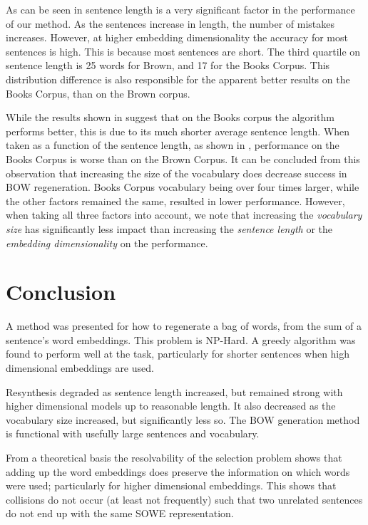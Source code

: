 \documentclass{book}
\begin{document}
As can be seen in  sentence length is a very significant factor in the performance of our method. As the sentences increase in length, the number of mistakes increases. However, at higher embedding dimensionality the accuracy for most sentences is high. This is because most sentences are short. The third quartile on sentence length is 25 words for Brown, and 17 for the Books Corpus. This distribution difference is also responsible for the apparent better results on the Books Corpus, than on the Brown corpus.

While the results shown in  suggest that on the Books corpus the algorithm performs better, this is due to its much shorter average sentence length. When taken as a function of the sentence length, as shown in ,  performance on the Books Corpus is worse than on the Brown Corpus. It can be concluded from this observation that increasing the size of the vocabulary does decrease success in BOW regeneration. Books Corpus vocabulary being over four times larger, while the other factors remained the same, resulted in lower performance. However, when taking all three factors into account, we note that increasing the \emph{vocabulary size} has significantly less impact than increasing the \emph{sentence length} or the \emph{embedding dimensionality} on the performance.


\section{Conclusion} \label{conclusion}
A method was presented for how to regenerate a bag of words, from the sum of a sentence's word embeddings. This problem is NP-Hard. A greedy algorithm was found to perform well at the task, particularly for shorter sentences when high dimensional embeddings are used. 

Resynthesis degraded as sentence length increased, but remained strong with higher dimensional models up to reasonable length. It also decreased as the vocabulary size increased, but significantly less so. The BOW generation method is functional with usefully large sentences and vocabulary.

From a theoretical basis the resolvability of the selection problem shows that adding up the word embeddings does preserve the information on which words were used; particularly for higher dimensional embeddings. This shows  that collisions do not occur (at least not frequently) such that two unrelated sentences do not end up with the same SOWE representation. 
\end{document}

